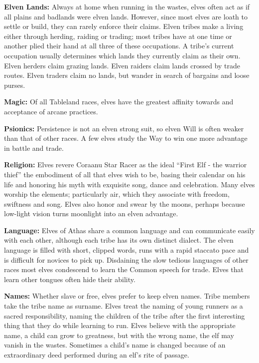\textbf{Elven Lands:} Always at home when running in the wastes, elves often act as if all plains and badlands were elven lands. However, since most elves are loath to settle or build, they can rarely enforce their claims. Elven tribes make a living either through herding, raiding or trading; most tribes have at one time or another plied their hand at all three of these occupations. A tribe's current occupation usually determines which lands they currently claim as their own. Elven herders claim grazing lands. Elven raiders claim lands crossed by trade routes. Elven traders claim no lands, but wander in search of bargains and loose purses.

\textbf{Magic:} Of all Tableland races, elves have the greatest affinity towards and acceptance of arcane practices.

\textbf{Psionics:} Persistence is not an elven strong suit, so elven Will is often weaker than that of other races. A few elves study the Way to win one more advantage in battle and trade.

\textbf{Religion:} Elves revere Coraanu Star Racer as the ideal ``First Elf - the warrior thief'' the embodiment of all that elves wish to be, basing their calendar on his life and honoring his myth with exquisite song, dance and celebration. Many elves worship the elements; particularly air, which they associate with freedom, swiftness and song. Elves also honor and swear by the moons, perhaps because low-light vision turns moonlight into an elven advantage.

\textbf{Language:} Elves of Athas share a common language and can communicate easily with each other, although each tribe has its own distinct dialect. The elven language is filled with short, clipped words, runs with a rapid staccato pace and is difficult for novices to pick up. Disdaining the slow tedious languages of other races most elves condescend to learn the Common speech for trade. Elves that learn other tongues often hide their ability.

\textbf{Names:} Whether slave or free, elves prefer to keep elven names. Tribe members take the tribe name as surname. Elves treat the naming of young runners as a sacred responsibility, naming the children of the tribe after the first interesting thing that they do while learning to run. Elves believe with the appropriate name, a child can grow to greatness, but with the wrong name, the elf may vanish in the wastes. Sometimes a child's name is changed because of an extraordinary deed performed during an elf's rite of passage.

